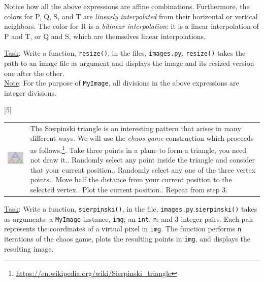 \documentclass[addpoints]{exam}
\begin{document}
\begin{questions}
  Notice how all the above expressions are affine combinations. Furthermore, the colors for P, Q, S, and T are \textit{linearly interpolated} from their horizontal or vertical neighbors. The color for R is a \textit{bilinear interpolation}: it is a linear interpolation of P and T, or Q and S, which are themselves linear interpolations.

  \underline{Task}: Write a function, \texttt{resize()}, in the files, \texttt{images.py}. \texttt{resize()} takes the path to an image file as argument and displays the image and its resized version one after the other.\\
  \underline{Note}: For the purpose of \texttt{MyImage}, all divisions in the above expressions are integer divisions.
  
  
[5]

  \begin{tabularx}{\linewidth}{cX}
    \includegraphics[scale=0.75, align=t]{sierpinski1}
    & The Sierpinski triangle is an interesting pattern that arises in many different ways. We will use the \textit{chaos game} construction which proceeds as follows.\footnote{\url{https://en.wikipedia.org/wiki/Sierpinski_triangle}}\newline
      1. Take three points in a plane to form a triangle, you need not draw it.\newline
      2. Randomly select any point inside the triangle and consider that your current position.\newline
      3. Randomly select any one of the three vertex points.\newline
      4. Move half the distance from your current position to the selected vertex.\newline
      5. Plot the current position.\newline
      6. Repeat from step 3.
  \end{tabularx}

  \underline{Task}: Write a function, \texttt{sierpinski()}, in the file, \texttt{images.py}.\texttt{sierpinski()} takes as arguments: a \texttt{MyImage} instance, \texttt{img}; an \texttt{int}, \texttt{n}; and 3 integer pairs. Each pair represents the coordinates of a virtual pixel in \texttt{img}. The function performs \texttt{n} iterations of the chaos game, plots the resulting points in \texttt{img}, and displays the resulting image.


\end{questions}
\end{document}
